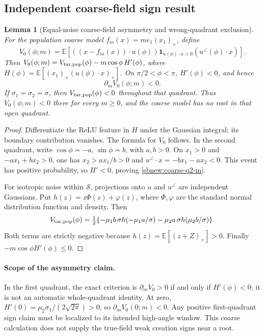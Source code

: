 \documentclass{article} %
\theoremstyle{plain}
\newtheorem{lemma}[theorem]{Lemma}
\theoremstyle{definition}
\theoremstyle{remark}
\begin{document}
\subsection{Independent coarse-field sign result}
\begin{lemma}[Equal-noise coarse-field asymmetry and wrong-quadrant exclusion]
\label{sbnew:coarse}
For the population coarse model $f_m(x)=m e_1(x_1)_+$, define
\[
 V_0(\phi;m)=\mathbb E[((x-f_m(x))\cdot u(\phi))
               \mathbf1_{u(\phi)\cdot x>0}(u^\angle(\phi)\cdot x)].
\]
Then $V_0(\phi;m)=V_{\rm tar,pop}(\phi)-m\cos\phi\,H'(\phi)$,
where $H(\phi)=\mathbb E[(x_1)_+(u(\phi)\cdot x)_+]$.
On $\pi/2<\phi<\pi$, $H'(\phi)<0$, and hence
\begin{equation}\label{sbnew:coarse-q2-m}
 \partial_m V_0(\phi;m)<0.
\end{equation}
If $\sigma_1=\sigma_2=\sigma$, then
$V_{\rm tar,pop}(\phi)<0$ throughout that quadrant. Thus
$V_0(\phi;m)<0$ there for every $m\ge0$, and the coarse model has no
root in that open quadrant.
\end{lemma}
\begin{proof}
Differentiate the ReLU feature in $H$ under the Gaussian integral; its
boundary contribution vanishes. The formula for $V_0$ follows. In the
second quadrant, write $\cos\phi=-a$, $\sin\phi=b$, with $a,b>0$.
On $x_1>0$ and $-ax_1+bx_2>0$, one has $x_2>ax_1/b>0$ and
$u^\angle\cdot x=-bx_1-ax_2<0$. This event has positive probability,
so $H'<0$, proving \eqref{sbnew:coarse-q2-m}.

For isotropic noise within $\mathcal S$, projections onto $u$ and
$u^\angle$ are independent Gaussians. Put
$h(z)=z\Phi(z)+\varphi(z)$, where $\Phi,\varphi$ are the standard
normal distribution function and density. Then
\[
 V_{\rm tar,pop}(\phi)
 =\tfrac12\{-\mu_1 b\,\sigma h(-\mu_1 a/\sigma)
             -\mu_2 a\,\sigma h(\mu_2 b/\sigma)\}.
\]
Both terms are strictly negative because
$h(z)=\mathbb E[(z+Z)_+]>0$.
Finally $-m\cos\phi H'(\phi)\le0$.
\end{proof}

\paragraph{Scope of the asymmetry claim.}
In the first quadrant, the exact criterion is
$\partial_mV_0>0$ if and only if $H'(\phi)<0$; it is not an automatic
whole-quadrant identity. At zero,
$H'(0)=\mu_2\sigma_1/(2\sqrt{2\pi})>0$, so
$\partial_mV_0(0;m)<0$. Any positive first-quadrant sign claim must be
localized to its intended high-angle window. This coarse calculation
does not supply the true-field weak creation signs near a root.
\end{document}
